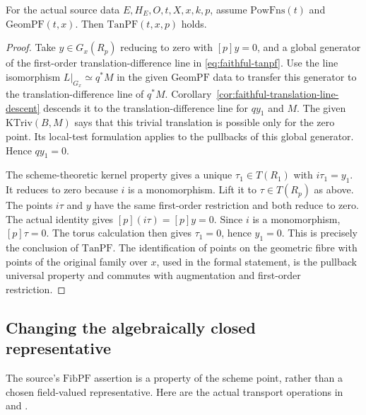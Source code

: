 \begin{srproposition}\label{prop:faithful-geompf-tanpf}
For the actual source data \(E,H_E,O,t,X,x,k,p\),
assume \(\mathrm{PowFns}(t)\) and
\(\mathrm{GeomPF}(t,x)\).
Then \(\mathrm{TanPF}(t,x,p)\) holds.
\end{srproposition}
\begin{proof}
Take \(y\in G_x(R_p)\) reducing to zero with \([p]y=0\),
and a global generator of the first-order
translation-difference line in
\eqref{eq:faithful-tanpf}.
Use the line isomorphism \(L|_{G_x}\simeq q^*M\) in
the given \(\mathrm{GeomPF}\) data to transfer this generator
to the translation-difference line of \(q^*M\).
Corollary~\ref{cor:faithful-translation-line-descent} descends
it to the translation-difference line for \(q y_1\) and \(M\).
The given \(\mathrm{KTriv}(B,M)\) says that this trivial
translation is possible only for the zero point.
Its local-test formulation applies to the pullbacks of
this global generator.  Hence \(q y_1=0\).

The scheme-theoretic kernel property gives a unique
\(\tau_1\in T(R_1)\) with \(i\tau_1=y_1\).
It reduces to zero because \(i\) is a monomorphism.
Lift it to \(\tau\in T(R_p)\) as above.
The points \(i\tau\) and \(y\) have the same first-order
restriction and both reduce to zero.
The actual  identity gives
\([p](i\tau)=[p]y=0\).
Since \(i\) is a monomorphism, \([p]\tau=0\).
The torus calculation then gives \(\tau_1=0\), hence
\(y_1=0\).
This is precisely the conclusion of \(\mathrm{TanPF}\).
The identification of points on the geometric fibre with
points of the original family over \(x\), used in the
formal statement, is the pullback universal property and
commutes with augmentation and first-order restriction.
\end{proof}

\subsection{Changing the algebraically closed representative}
\label{subsec:faithful-fibpf-common-field}

The source's \(\mathrm{FibPF}\) assertion is a property
of the scheme point, rather than a chosen field-valued
representative.
Here are the actual transport operations in
 and .

